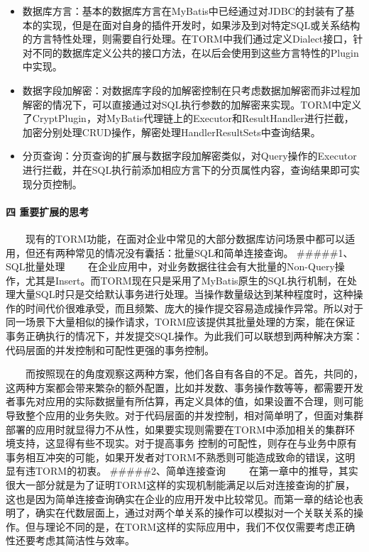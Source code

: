 \documentclass[]{article}
\begin{document}
\begin{itemize}
\itemsep1pt\parskip0pt
\item
  数据库方言：基本的数据库方言在MyBatis中已经通过对JDBC的封装有了基本的实现，但是在面对自身的插件开发时，如果涉及到对特定SQL或关系结构的方言特性处理，则需要自行处理。在TORM中我们通过定义Dialect接口，针对不同的数据库定义公共的接口方法，在以后会使用到这些方言特性的Plugin中实现。
\item
  数据字段加解密：对数据库字段的加解密控制在只考虑数据加解密而非过程加解密的情况下，可以直接通过对SQL执行参数的加解密来实现。TORM中定义了CryptPlugin，对MyBatis代理链上的Executor和ResultHandler进行拦截，加密分别处理CRUD操作，解密处理HandlerResultSets中查询结果。
\item
  分页查询：分页查询的扩展与数据字段加解密类似，对Query操作的Executor进行拦截，并在SQL执行前添加相应方言下的分页属性内容，查询结果即可实现分页控制。
\end{itemize}

\paragraph{四
重要扩展的思考}\label{ux56db-ux91cdux8981ux6269ux5c55ux7684ux601dux8003}

　　现有的TORM功能，在面对企业中常见的大部分数据库访问场景中都可以适用，但还有两种常见的情况没有囊括：批量SQL和简单连接查询。
\#\#\#\#\#1、SQL批量处理
　　在企业应用中，对业务数据往往会有大批量的Non-Query操作，尤其是Insert。而TORM现在只是采用了MyBatis原生的SQL执行机制，在处理大量SQL时只是交给默认事务进行处理。当操作数量级达到某种程度时，这种操作的时间代价很难承受，而且频繁、庞大的操作提交容易造成操作异常。所以对于同一场景下大量相似的操作请求，TORM应该提供其批量处理的方案，能在保证事务正确执行的情况下，并发提交SQL操作。为此我们可以联想到两种解决方案：代码层面的并发控制和可配性更强的事务控制。

　　而按照现在的角度观察这两种方案，他们各自有各自的不足。首先，共同的，这两种方案都会带来繁杂的额外配置，比如并发数、事务操作数等等，都需要开发者事先对应用的实际数据量有所估算，再定义具体的值，如果设置不合理，则可能导致整个应用的业务失败。对于代码层面的并发控制，相对简单明了，但面对集群部署的应用时就显得力不从性，如果要实现则需要在TORM中添加相关的集群环境支持，这显得有些不现实。对于提高事务
控制的可配性，则存在与业务中原有事务相互冲突的可能，如果开发者对TORM不熟悉则可能造成致命的错误，这明显有违TORM的初衷。
\#\#\#\#\#2、简单连接查询
　　在第一章中的推导，其实很大一部分就是为了证明TORM这样的实现机制能满足以后对连接查询的扩展，这也是因为简单连接查询确实在企业的应用开发中比较常见。而第一章的结论也表明了，确实在代数层面上，通过对两个单关系的操作可以模拟对一个关联关系的操作。但与理论不同的是，在TORM这样的实际应用中，我们不仅仅需要考虑正确性还要考虑其简洁性与效率。
\end{document}
